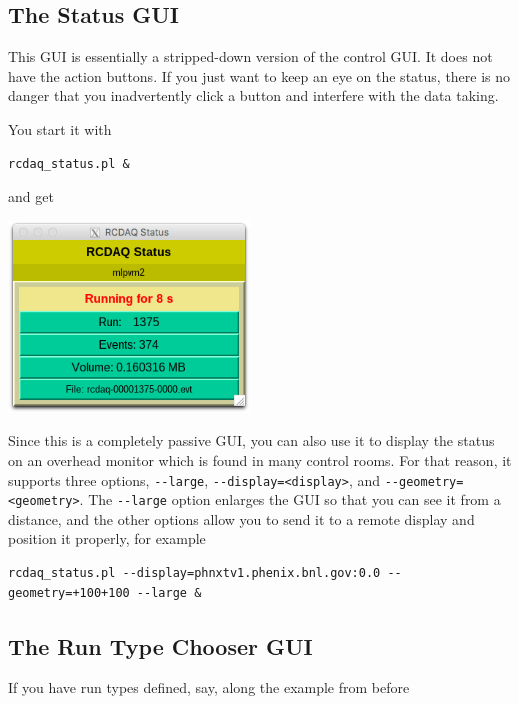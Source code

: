 \documentclass{article}[11pt]
\begin{document}
\subsection{The Status GUI}

This GUI is essentially a stripped-down version of the control GUI. It
does not have the action buttons.  If you just want to keep an eye on
the status, there is no danger that you inadvertently click a button and 
interfere with the data taking. 

You start it with 

\begin{verbatim}
rcdaq_status.pl &
\end{verbatim}

and get 

\begin{center}
\label{rcdaqstatus}\includegraphics[height=2in]{rcdaqstatus.png}
\end{center}

Since this is a completely passive GUI, you can also use it to display
the status on an overhead monitor which is found in many control
rooms.  For that reason, it supports three options, \verb|--large|,
\verb|--display=<display>|, and \verb|--geometry=<geometry>|.  The
\verb|--large| option enlarges the GUI so that you can see it from a
distance, and the other options allow you to send it to a remote
display and position it properly, for example
 
\begin{verbatim}
rcdaq_status.pl --display=phnxtv1.phenix.bnl.gov:0.0 --geometry=+100+100 --large &
\end{verbatim}

\subsection{The Run Type Chooser GUI}

If you have run types defined, say, along the example from before
\end{document}
